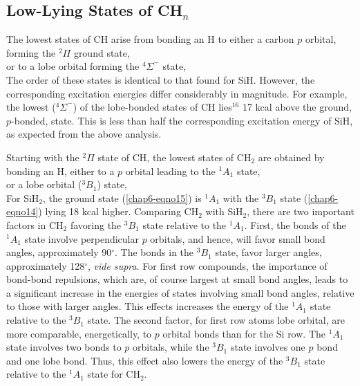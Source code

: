 \subsection{Low-Lying States of CH$_n$}

The lowest states of CH arise from bonding an H to either a carbon 
$p$ orbital, forming the ${^2\Pi}$ ground state,
\begin{equation}
\end{equation}
or to a lobe orbital forming the ${^4\Sigma}^-$ state,
\begin{equation}
\end{equation}
The order of these states is identical to that found for SiH.  
However, the corresponding excitation energies differ considerably in 
magnitude.  For example, the lowest (${^4\Sigma}^-$) of the 
lobe-bonded states of CH lies$^{16}$ 17 kcal above the ground, 
$p$-bonded, state.  This is less than half the corresponding 
excitation energy of SiH, as expected from the above analysis.

Starting with the ${^2\Pi}$ state of CH, the lowest states of CH$_2$ 
are obtained by bonding an H, either to a $p$ orbital leading to the 
${^1A}_1$ state,
\begin{equation}
\end{equation}
or a lobe orbital (${^3B}_1$) state,
\begin{equation}
\label{chap6-eqno27}
\end{equation}
For SiH$_2$, the ground state (\ref{chap6-eqno15}) is ${^1A}_1$ with
the ${^3B}_1$ state (\ref{chap6-eqno14}) lying 18 kcal higher.
Comparing CH$_2$ with SiH$_2$, there are two important factors in
CH$_2$ favoring the ${^3B}_1$ state relative to the ${^1A}_1$.  First,
the bonds of the ${^1A}_1$ state involve perpendicular $p$ orbitals,
and hence, will favor small bond angles, approximately 90$^{\circ}$.
The bonds in the ${^3B}_1$ state, favor larger angles, approximately
128$^{\circ}$, {\it vide supra}. For first row compounds, the
importance of bond-bond repulsions, which are, of course largest at
small bond angles, leads to a significant increase in the energies of
states involving small bond angles, relative to those with larger
angles.  This effects increases the energy of the ${^1A}_1$ state
relative to the ${^3B}_1$ state.  The second factor, for first row
atoms lobe orbital, are more comparable, energetically, to $p$ orbital
bonds than for the Si row.  The ${^1A}_1$ state involves two bonds to
$p$ orbitals, while the ${^3B}_1$ state involves one $p$ bond and one
lobe bond.  Thus, this effect also lowers the energy of the ${^3B}_1$
state relative to the ${^1A}_1$ state for CH$_2$.

